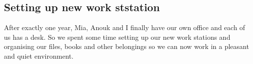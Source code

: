 \subsection{Setting up new work ststation}
\label{task:20180108_cj0}

After exactly one year, Mia, Anouk and I finally have our own office and each of us has a desk. So we spent some time setting up our new work stations and organising our files, books and other belongings so we can now work in a pleasant and quiet environment. 


